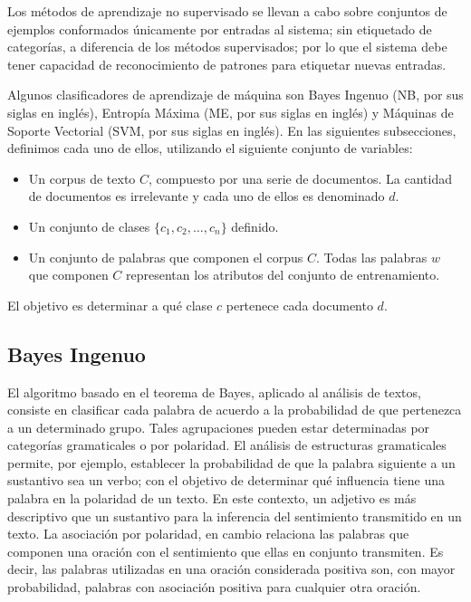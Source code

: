{Los m\'etodos de aprendizaje no supervisado se llevan a cabo sobre conjuntos de ejemplos conformados \'unicamente por entradas al sistema; sin etiquetado de categor\'ias, a diferencia de los m\'etodos supervisados; por lo que el sistema debe tener capacidad de reconocimiento de patrones para etiquetar nuevas entradas.
\newline

Algunos clasificadores de aprendizaje de m\'aquina son Bayes Ingenuo (NB, por sus siglas en ingl\'es), Entrop\'ia M\'axima (ME, por sus siglas en ingl\'es) y M\'aquinas de Soporte Vectorial (SVM, por sus siglas en ingl\'es). En las siguientes subsecciones, definimos cada uno de ellos, utilizando el siguiente conjunto de variables:

\begin{itemize}
\item Un corpus de texto $C$, compuesto por una serie de documentos. La cantidad de documentos es irrelevante y cada uno de ellos es denominado $d$. 
\item Un conjunto de clases $\{c_{1},c_{2},\ldots,c_{n}\}$ definido.
\item Un conjunto de palabras que componen el corpus $C$. Todas las palabras $w$ que componen $C$ representan los atributos del conjunto de entrenamiento.
\end{itemize}

El objetivo es determinar a qu\'e clase $c$ pertenece cada documento $d$.

\subsection{Bayes Ingenuo} \label{bayes_sec}

El algoritmo basado en el teorema de Bayes, aplicado al an\'alisis de textos, consiste en clasificar cada palabra de acuerdo a la probabilidad de que pertenezca a un determinado grupo. Tales agrupaciones pueden estar determinadas por categor\'ias gramaticales o por polaridad. 
El an\'alisis de estructuras gramaticales permite, por ejemplo, establecer la probabilidad de que la palabra siguiente a un sustantivo sea un verbo; con el objetivo de determinar qu\'e influencia tiene una palabra en la polaridad de un texto. En este contexto, un adjetivo es m\'as descriptivo que un sustantivo para la inferencia del sentimiento transmitido en un texto. La asociaci\'on por polaridad, en cambio relaciona las palabras que componen una oraci\'on con el sentimiento que ellas en conjunto transmiten. Es decir, las palabras utilizadas en una oraci\'on considerada positiva son, con mayor probabilidad, palabras con asociaci\'on positiva para cualquier otra oraci\'on.
\newline

}
